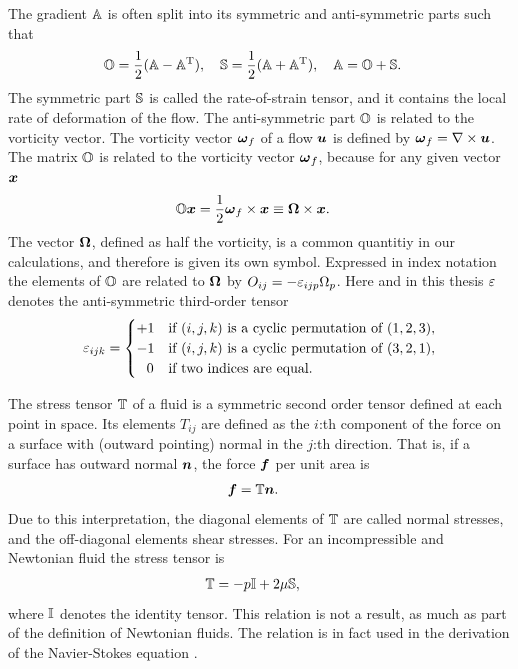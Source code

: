 \documentclass[thesis.tex]{subfiles}
\begin{document}
The gradient $\mathbb{A}$ is often split into its symmetric and anti-symmetric parts such that
\begin{align*}
	&\mathbb{O} = \frac{1}{2}(\mathbb{A} - \mathbb{A}^{\mathrm T}),\quad
	\mathbb{S} = \frac{1}{2}(\mathbb{A} + \mathbb{A}^{\mathrm T}),\quad
	\mathbb{A} = \mathbb{O} + \mathbb{S}.
\end{align*}
The symmetric part $\mathbb{S}$ is called the rate-of-strain tensor, and it contains the local rate of deformation of the flow. The anti-symmetric part $\mathbb{O}$ is related to the vorticity vector. The vorticity vector $\mbox{\boldmath$\omega$}_f$ of a flow $\mbox{\boldmath$u$}$ is defined by $\mbox{\boldmath$\omega$}_f = \nabla \times \mbox{\boldmath$u$}$. The matrix $\mathbb{O}$ is related to the vorticity vector $\mbox{\boldmath$\omega$}_f$, because for any given vector $\mbox{\boldmath$x$}$
\begin{align}
	\ma O \ve x &= \frac{1}{2}\ve \omega_f \cross \ve x \equiv \ve \Omega \cross \ve x.\eqnlab{vorticityOdef}
\end{align}
The vector $\mbox{\boldmath$\Omega$}$, defined as half the vorticity, is a common quantitiy in our calculations, and therefore is given its own symbol. Expressed in index notation the elements of $\mathbb{O}$ are related to $\mbox{\boldmath$\Omega$}$ by $O_{ij} = -\varepsilon_{ijp}\Omega_p$. Here and in this thesis $\varepsilon$ denotes the anti-symmetric third-order tensor
\begin{align*}
\varepsilon_{ijk} = \begin{cases}
+1 & \textrm{if } (i,j,k) \textrm{ is a cyclic permutation of } (1,2,3), \\
-1 & \textrm{if } (i,j,k) \textrm{ is a cyclic permutation of } (3,2,1), \\
\;\;\,0 & \textrm{if two indices are equal.}
\end{cases}\end{align*}

The stress tensor $\mathbb{T}$ of a fluid is a symmetric second order tensor defined at each point in space. Its elements $T_{ij}$ are defined as the $i$:th component of the force on a surface with (outward pointing) normal in the $j$:th direction. That is, if a surface has outward normal $\mbox{\boldmath$n$}$, the force $\mbox{\boldmath$f$}$ per unit area is
\begin{align*}
	\mbox{\boldmath$f$} &= \mathbb{T} \mbox{\boldmath$n$}.
\end{align*}
Due to this interpretation, the diagonal elements of $\mathbb{T}$ are called normal stresses, and the off-diagonal elements shear stresses. For an incompressible and Newtonian fluid the stress tensor is
\begin{align*}
	\mathbb{T} &= -p \mathbb{I} + 2\mu \mathbb{S},
\end{align*}
where $\mathbb{I}$ denotes the identity tensor. This relation is not a result, as much as part of the definition of Newtonian fluids. The relation is in fact used in the derivation of the Navier-Stokes equation  \cite{kundu2004}. 
\end{document}
